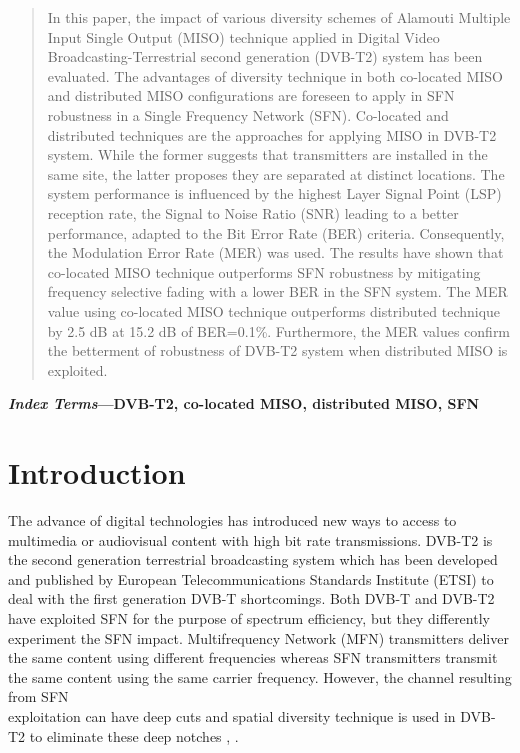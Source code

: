 \documentclass[10pt, conference]{IEEEtran}
\begin{document}
\begin{abstract}
In this paper, the impact of various diversity schemes of Alamouti Multiple Input Single Output (MISO) technique applied in Digital Video Broadcasting-Terrestrial second generation (DVB-T2) system has been evaluated. The advantages of diversity technique in both co-located MISO and distributed MISO configurations are foreseen to apply in SFN robustness in a Single Frequency Network (SFN). Co-located and distributed techniques are the approaches for applying MISO in DVB-T2 system. While the former suggests that transmitters are installed in the same site, the latter proposes they are separated at distinct locations. The system performance is influenced by the highest Layer Signal Point (LSP) reception rate, the Signal to Noise Ratio (SNR) leading to a better performance, adapted to the Bit Error Rate (BER) criteria. Consequently, the Modulation Error Rate (MER) was used. The results have shown that co-located MISO technique outperforms SFN robustness by mitigating frequency selective fading with a lower BER in the SFN system. The MER value using co-located MISO technique outperforms distributed technique by 2.5 dB at 15.2 dB of BER=0.1\%. Furthermore, the MER values confirm the betterment of robustness of DVB-T2 system when distributed MISO is exploited.
\end{abstract}

\normalsize{
\textbf{\textit{Index Terms}—DVB-T2, co-located MISO, distributed MISO,
SFN}
}

\section{Introduction}
\linespread{1.2}
\normalsize{
The advance of digital technologies has introduced new
ways to access to multimedia or audiovisual content with
high bit rate transmissions. DVB-T2 is the second generation terrestrial broadcasting system which has been developed and published by European Telecommunications Standards Institute (ETSI) to deal with the first generation DVB-T shortcomings. Both DVB-T and DVB-T2 have exploited SFN for the purpose of spectrum efficiency, but they differently experiment the SFN impact. Multifrequency Network (MFN) transmitters deliver the same content using different frequencies whereas SFN transmitters transmit the same content using the same carrier frequency. However, the channel resulting from SFN \\exploitation can have deep cuts and spatial diversity technique is used in DVB-T2 to eliminate these deep notches \cite{1}, \cite{2}. }
\end{document}
